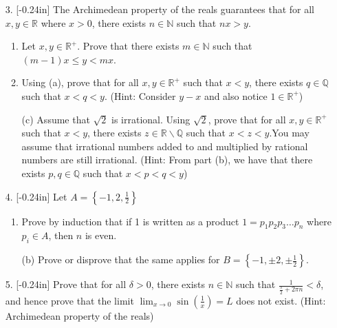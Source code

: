 \documentclass[letterpaper,12pt]{article}
\newcommand{\set}[1]{\left\{ #1 \right\}}
\theoremstyle{definition}
\begin{document}
\pagebreak
\begin{enumerate}
    \item[3.]  \reversemarginpar{}[-0.24in] The Archimedean property of the reals guarantees that for all $x,y \in \mathbb{R}$ where $x > 0$, there exists $n \in \mathbb{N}$ such that $nx > y$. \begin{enumerate}
        \item Let $x,y \in \mathbb{R}^+$. Prove that there exists $m \in \mathbb{N}$ such that $(m-1)x \leq y < mx$.
        \vspace{2.4in}
        \item Using (a), prove that for all $x,y \in \mathbb{R}^+$ such that $x<y$, there exists $q \in \mathbb{Q}$ such that $x < q < y$. (Hint: Consider $y-x$ and also notice $1 \in \mathbb{R}^+$)
    \end{enumerate}
\end{enumerate}
\pagebreak
\begin{enumerate}
    \item[] \begin{enumerate}
        \item[(c)] Assume that $\sqrt{2}$ is irrational. Using $\sqrt{2}$, prove that for all $x,y \in \mathbb{R}^+$ such that $x<y$, there exists $z \in \mathbb{R}\backslash \mathbb{Q}$ such that $x<z<y$.You may assume that irrational numbers added to and multiplied by rational numbers are still irrational.  (Hint: From part (b), we have that there exists $p,q \in \mathbb{Q}$ such that $x<p<q<y$)
    \end{enumerate}
\end{enumerate}
\pagebreak
\begin{enumerate}
    \item[4.]\reversemarginpar{}[-0.24in] 
 Let $A = \set{-1, 2, \frac{1}{2}}$ 
 \begin{enumerate}
     \item  Prove by induction that if 1 is written as a product $1=p_1p_2p_3\ldots p_n$ where $p_i \in A$, then $n$ is even. 
 \end{enumerate}
\end{enumerate}
\pagebreak
\begin{enumerate}
    \item[] \begin{enumerate}
        \item[(b)] Prove or disprove that the same applies for $B = \set{-1, \pm 2, \pm \frac{1}{2}}$.
    \end{enumerate}
\end{enumerate}
\pagebreak
\begin{enumerate}
    \item[5.] \reversemarginpar{}[-0.24in] Prove that for all $\delta > 0$, there exists $n \in \mathbb{N}$ such that $\frac{1}{\frac{\pi}{2}+2\pi n} < \delta$, and hence prove that the limit $\lim_{x \rightarrow 0} \sin \left (\frac{1}{x} \right ) = L$ does not exist. (Hint: Archimedean property of the reals)
\end{enumerate}
\end{document}
